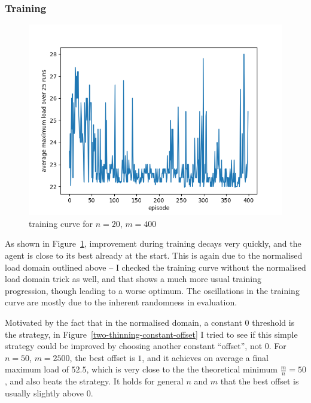 \subsubsection{Training}


\begin{figure}[h]
    \centering
    \includegraphics[scale=0.6]{Chapter4/Figs/training_progression_20_400.png}
    \caption{\TwoThinning training curve for $n=20$, $m=400$}
     \label{two-thinning-training-curve}
\end{figure}

As shown in Figure~\ref{two-thinning-training-curve}, improvement during training decays very quickly, and the agent is close to its best already at the start. This is again due to the normalised load domain outlined above -- I checked the training curve without the normalised load domain trick as well, and that shows a much more usual training progression, though leading to a worse optimum. The oscillations in the training curve are mostly due to the inherent randomness in evaluation.


Motivated by the fact that in the normalised domain, a constant $0$ threshold is the \MeanThinning strategy, in Figure~\ref{two-thinning-constant-offset} I tried to see if this simple \MeanThinning strategy could be improved by choosing another constant ``offset'', not $0$. For $n=50$, $m=2500$, the best offset is $1$, and it achieves on average a final maximum load of $52.5$, which is very close to the the theoretical minimum $\frac{m}{n}=50$, and also beats the \DQN strategy. It holds for general $n$ and $m$ that the best offset is usually slightly above $0$.

